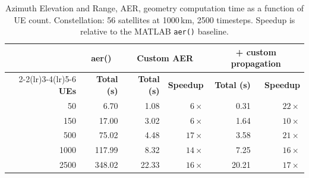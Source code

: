 \begin{table}[H]
    \centering
    \caption{Azimuth Elevation and Range, AER, geometry computation time as a function of \ac{UE} count.
             Constellation: 56 satellites at 1000\,km, 2500 timesteps.
             Speedup is relative to the MATLAB \texttt{aer()} baseline.}
    \label{tab:aer_speedup}
    \begin{tabular}{r r r r r r}
        \toprule
        & \multicolumn{1}{c}{\textbf{aer()}}
        & \multicolumn{2}{c}{\textbf{Custom AER}}
        & \multicolumn{2}{c}{\textbf{+ custom propagation}} \\
        \cmidrule(lr){2-2}\cmidrule(lr){3-4}\cmidrule(lr){5-6}
        \textbf{UEs} & \textbf{Total (s)} & \textbf{Total (s)} & \textbf{Speedup}
                     & \textbf{Total (s)} & \textbf{Speedup} \\
        \midrule
           50 &   6.70 &  1.08 & $6\times$ &  0.31 & $22\times$ \\
          150 &  17.00 &  3.02 & $6\times$ &  1.64 & $10\times$ \\
          500 &  75.02 &  4.48 & $17\times$ &  3.58 & $21\times$ \\
         1000 & 117.99 &  8.32 & $14\times$ &  7.25 & $16\times$ \\
         2500 & 348.02 & 22.33 & $16\times$ & 20.21 & $17\times$ \\
        \bottomrule
    \end{tabular}
\end{table}
